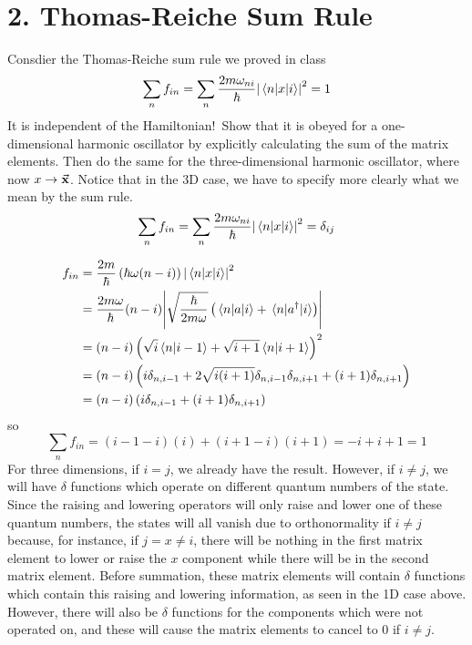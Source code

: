 \documentclass[a4paper,twoside]{article}
\begin{document}
\section*{2. Thomas-Reiche Sum Rule}
Consdier the Thomas-Reiche sum rule we proved in class
\begin{equation}
    \sum_n f_{in} = \sum_n \frac{2m \omega_{ni}}{\hbar}\abs{\mel{n}{x}{i}}^2 = 1
\end{equation}
It is independent of the Hamiltonian!\ Show that it is obeyed for a one-dimensional harmonic oscillator by explicitly calculating the sum of the matrix elements. Then do the same for the three-dimensional harmonic oscillator, where now $ x \to \va{x} $. Notice that in the 3D case, we have to specify more clearly what we mean by the sum rule.
\begin{equation}
    \sum_n f_{in} = \sum_n \frac{2m \omega_{ni}}{\hbar} \abs{\mel{n}{x}{i}}^2 = \delta_{ij}
\end{equation}
\begin{problem}
    \begin{align}
        f_{in} &= \frac{2m}{\hbar} \left( \hbar \omega (n - i) \right) \abs{\mel{n}{x}{i}}^2 \\
        &= \frac{2m \omega}{\hbar} (n-i) \abs{\sqrt{\frac{\hbar}{2m \omega}} \left( \mel{n}{a}{i} + \mel{n}{a^\dagger}{i} \right)} \\
        &= (n-i) \left( \sqrt{i}\bra{n}\ket{i-1} + \sqrt{i+1}\bra{n}\ket{i+1} \right)^2 \\
        &= (n-i)\left( i \delta_{n,i-1} + 2 \sqrt{i(i+1)} \delta_{n,i-1} \delta_{n,i+1} + (i+1) \delta_{n,i+1} \right) \\
        &= (n-i)\left( i \delta_{n,i-1} + (i+1) \delta_{n,i+1} \right)
    \end{align}
    so
    \begin{equation}
        \sum_n f_{in} = (i-1-i)(i) + (i+1-i)(i+1) = -i + i + 1 = 1
    \end{equation}
    For three dimensions, if $ i = j $, we already have the result. However, if $ i \neq j $, we will have $\delta$ functions which operate on different quantum numbers of the state. Since the raising and lowering operators will only raise and lower one of these quantum numbers, the states will all vanish due to orthonormality if $ i \neq j $ because, for instance, if $ j = x \neq i $, there will be nothing in the first matrix element to lower or raise the $ x $ component while there will be in the second matrix element. Before summation, these matrix elements will contain $\delta$ functions which contain this raising and lowering information, as seen in the 1D case above. However, there will also be $\delta$ functions for the components which were not operated on, and these will cause the matrix elements to cancel to $ 0 $ if $ i \neq j $.
\end{problem}
\end{document}
